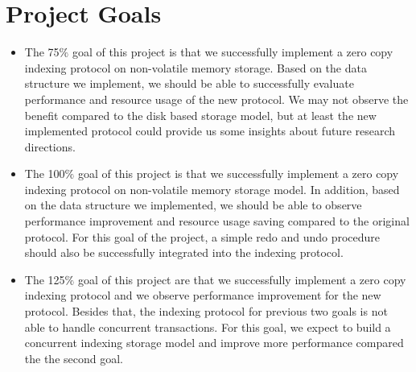 \section{Project Goals}
\begin{itemize}
    \item The 75$\%$ goal of this project is that we successfully implement a zero copy indexing protocol on non-volatile memory storage. Based on the data structure we implement, we should be able to successfully evaluate performance and resource usage of the new protocol. We may not observe the benefit compared to the disk based storage model, but at least the new implemented protocol could provide us some insights about future research directions. 
    \item The 100$\%$ goal of this project is that we successfully implement a zero copy     indexing protocol on non-volatile memory storage model. In addition, based on the data structure we implemented, we should be able to observe performance improvement and resource usage saving compared to the original protocol. For this goal of the project, a simple redo and undo procedure should also be successfully integrated into the indexing protocol.
    \item The 125$\%$ goal of this project are that we successfully implement a zero copy indexing protocol and we observe performance improvement for the new protocol. Besides that, the indexing protocol for previous two goals is not able to handle concurrent transactions. For this goal, we expect to build a concurrent indexing storage model and improve more performance compared the the second goal. 
\end{itemize}
